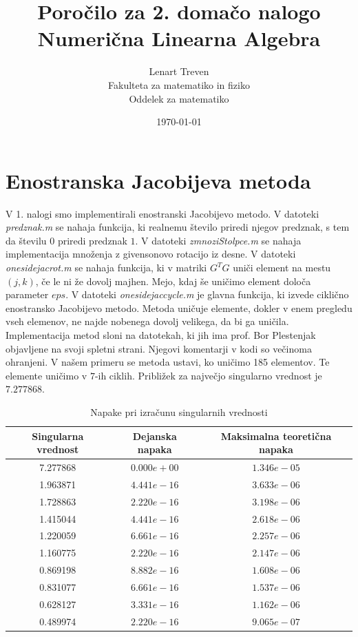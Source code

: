 \documentclass[a4paper,12pt]{article}
\title{Poročilo za 2. domačo nalogo  \\ 
\Large Numerična Linearna Algebra}
\author{Lenart Treven \\
Fakulteta za matematiko in fiziko \\
Oddelek za matematiko}
\date{\today}
\begin{document}


\maketitle

\section{Enostranska Jacobijeva metoda}
V 1. nalogi smo implementirali enostranski Jacobijevo metodo. V datoteki \emph{predznak.m} se nahaja funkcija, ki realnemu število priredi njegov predznak, s tem da številu $0$ priredi predznak $1$.  V datoteki \emph{zmnoziStolpce.m} se nahaja implementacija množenja z givensonovo rotacijo iz desne. V datoteki \emph{onesidejacrot.m} se nahaja funkcija, ki v matriki $G^TG$ uniči element na mestu $(j, k)$, če le ni že dovolj majhen. Mejo, kdaj še uničimo element določa parameter $eps$. V datoteki \emph{onesidejaccycle.m} je glavna funkcija, ki izvede ciklično enostransko Jacobijevo metodo. Metoda uničuje elemente, dokler v enem pregledu vseh elemenov, ne najde nobenega dovolj velikega, da bi ga uničila. Implementacija metod sloni na datotekah, ki jih ima prof. Bor Plestenjak objavljene na svoji spletni strani. Njegovi komentarji v kodi so večinoma ohranjeni.  V našem primeru se metoda ustavi, ko uničimo 185 elementov. Te elemente uničimo v $7$-ih ciklih. Približek za največjo singularno vrednost je $7.277868$.

\begin{table}[h!!!]
	\centering
	\caption{Napake pri izračunu singularnih vrednosti}
	\label{my-label}
	\begin{tabular}{|c|c|c|}
		\hline
		Singularna vrednost & Dejanska napaka & Maksimalna teoretična napaka \\ \hline \hline
		7.277868            & $0.000e+00$     & $1.346e-05$                  \\ \hline
		1.963871            & $4.441e-16$     & $3.633e-06$                  \\ \hline
		1.728863            & $2.220e-16$     & $3.198e-06$                  \\ \hline
		1.415044            & $4.441e-16$     & $2.618e-06$                  \\ \hline
		1.220059            & $6.661e-16$     & $2.257e-06$                  \\ \hline
		1.160775            & $2.220e-16$     & $2.147e-06$                  \\ \hline
		0.869198            & $8.882e-16$     & $1.608e-06$                  \\ \hline
		0.831077            & $6.661e-16$     & $1.537e-06$                  \\ \hline
		0.628127            & $3.331e-16$     & $1.162e-06$                  \\ \hline
		0.489974            & $2.220e-16$     & $9.065e-07$                  \\ \hline
	\end{tabular}
\end{table}
\newpage
\end{document}
